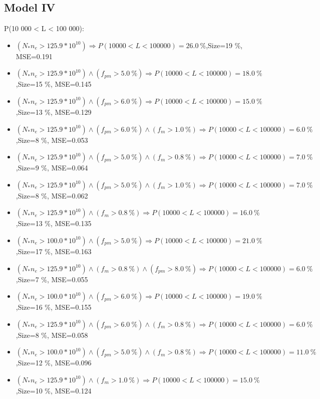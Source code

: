 \documentclass[numbered]{CSL}
\begin{document}
\subsection{Model IV}
P(10 000 < L < 100 000):
\begin{itemize}
\item $(N_* n_e > 125.9 * 10^{10}) \Rightarrow P(10 000 < L < 100 000) = 26.0~\%$,\hfill Size=19 \%, MSE=0.191
\item $(N_* n_e > 125.9 * 10^{10}) \land (f_{pm} > 5.0~\%) \Rightarrow P(10 000 < L < 100 000) = 18.0~\%$,\hfill Size=15 \%, MSE=0.145
\item $(N_* n_e > 125.9 * 10^{10}) \land (f_{pm} > 6.0~\%) \Rightarrow P(10 000 < L < 100 000) = 15.0~\%$,\hfill Size=13 \%, MSE=0.129
\item $(N_* n_e > 125.9 * 10^{10}) \land (f_{pm} > 6.0~\%) \land (f_m > 1.0~\%) \Rightarrow P(10 000 < L < 100 000) = 6.0~\%$,\hfill Size=8 \%, MSE=0.053
\item $(N_* n_e > 125.9 * 10^{10}) \land (f_{pm} > 5.0~\%) \land (f_m > 0.8~\%) \Rightarrow P(10 000 < L < 100 000) = 7.0~\%$,\hfill Size=9 \%, MSE=0.064
\item $(N_* n_e > 125.9 * 10^{10}) \land (f_{pm} > 5.0~\%) \land (f_m > 1.0~\%) \Rightarrow P(10 000 < L < 100 000) = 7.0~\%$,\hfill Size=8 \%, MSE=0.062
\item $(N_* n_e > 125.9 * 10^{10}) \land (f_m > 0.8~\%) \Rightarrow P(10 000 < L < 100 000) = 16.0~\%$,\hfill Size=13 \%, MSE=0.135
\item $(N_* n_e > 100.0 * 10^{10}) \land (f_{pm} > 5.0~\%) \Rightarrow P(10 000 < L < 100 000) = 21.0~\%$,\hfill Size=17 \%, MSE=0.163
\item $(N_* n_e > 125.9 * 10^{10}) \land (f_m > 0.8~\%) \land (f_{pm} > 8.0~\%) \Rightarrow P(10 000 < L < 100 000) = 6.0~\%$,\hfill Size=7 \%, MSE=0.055
\item $(N_* n_e > 100.0 * 10^{10}) \land (f_{pm} > 6.0~\%) \Rightarrow P(10 000 < L < 100 000) = 19.0~\%$,\hfill Size=16 \%, MSE=0.155
\item $(N_* n_e > 125.9 * 10^{10}) \land (f_{pm} > 6.0~\%) \land (f_m > 0.8~\%) \Rightarrow P(10 000 < L < 100 000) = 6.0~\%$,\hfill Size=8 \%, MSE=0.058
\item $(N_* n_e > 100.0 * 10^{10}) \land (f_{pm} > 5.0~\%) \land (f_m > 0.8~\%) \Rightarrow P(10 000 < L < 100 000) = 11.0~\%$,\hfill Size=12 \%, MSE=0.096
\item $(N_* n_e > 125.9 * 10^{10}) \land (f_m > 1.0~\%) \Rightarrow P(10 000 < L < 100 000) = 15.0~\%$,\hfill Size=10 \%, MSE=0.124

\end{itemize}
\end{document}
